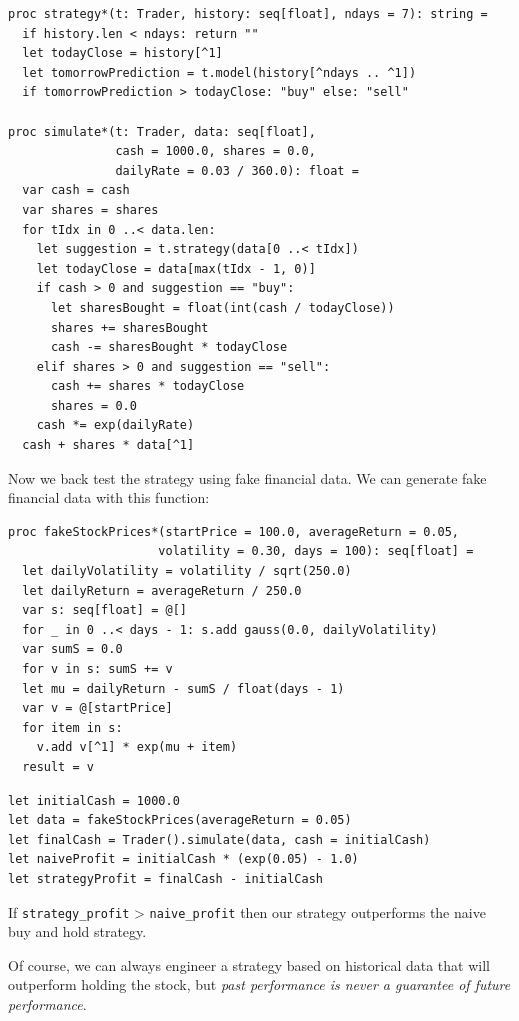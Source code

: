 \documentclass[justified, sixbynine]{tufte-book}
\def\ft{\small\tt}
\theoremstyle{plain}%
\newtheorem * {corollary}{Corollary}
\theoremstyle{definition}
\theoremstyle{remark}
\newtheorem * {remark}{Remark}
\newtheorem * {note}{Note}
\begin{document}
\begin{fullwidth}
\begin{lstlisting}[caption={in file: {\ft nlib/finance.nim}}]
proc strategy*(t: Trader, history: seq[float], ndays = 7): string =
  if history.len < ndays: return ""
  let todayClose = history[^1]
  let tomorrowPrediction = t.model(history[^ndays .. ^1])
  if tomorrowPrediction > todayClose: "buy" else: "sell"

proc simulate*(t: Trader, data: seq[float],
               cash = 1000.0, shares = 0.0,
               dailyRate = 0.03 / 360.0): float =
  var cash = cash
  var shares = shares
  for tIdx in 0 ..< data.len:
    let suggestion = t.strategy(data[0 ..< tIdx])
    let todayClose = data[max(tIdx - 1, 0)]
    if cash > 0 and suggestion == "buy":
      let sharesBought = float(int(cash / todayClose))
      shares += sharesBought
      cash -= sharesBought * todayClose
    elif shares > 0 and suggestion == "sell":
      cash += shares * todayClose
      shares = 0.0
    cash *= exp(dailyRate)
  cash + shares * data[^1]
\end{lstlisting}

Now we back test the strategy using fake financial data. We can generate fake financial data with this function:

\begin{lstlisting}[caption={in file: {\ft nlib/finance.nim}}]
proc fakeStockPrices*(startPrice = 100.0, averageReturn = 0.05,
                     volatility = 0.30, days = 100): seq[float] =
  let dailyVolatility = volatility / sqrt(250.0)
  let dailyReturn = averageReturn / 250.0
  var s: seq[float] = @[]
  for _ in 0 ..< days - 1: s.add gauss(0.0, dailyVolatility)
  var sumS = 0.0
  for v in s: sumS += v
  let mu = dailyReturn - sumS / float(days - 1)
  var v = @[startPrice]
  for item in s:
    v.add v[^1] * exp(mu + item)
  result = v
\end{lstlisting}

\begin{lstlisting}
let initialCash = 1000.0
let data = fakeStockPrices(averageReturn = 0.05)
let finalCash = Trader().simulate(data, cash = initialCash)
let naiveProfit = initialCash * (exp(0.05) - 1.0)
let strategyProfit = finalCash - initialCash
\end{lstlisting}

If {\ft strategy\_profit} > {\ft naive\_profit} then our strategy outperforms the naive buy and hold strategy.

Of course, we can always engineer a strategy based on historical data that will outperform holding the stock, but {\it past performance is never a guarantee of future performance}.


\end{fullwidth}
\end{document}
